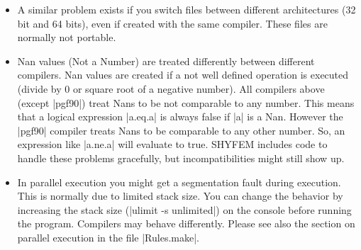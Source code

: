 \begin{itemize}
\item A similar problem exists if you switch files between different
architectures (32 bit and 64 bits), even if created with the same
compiler. These files are normally not portable.

\item Nan values (Not a Number) are treated differently between different
compilers. Nan values are created if a not well defined operation is
executed (divide by 0 or square root of a negative number). All compilers
above (except |pgf90|) treat Nans to be not comparable to any number.
This means that a logical expression |a.eq.a| is always false if |a|
is a Nan. However the |pgf90| compiler treats Nans to be comparable
to any other number. So, an expression like |a.ne.a| will evaluate to
true. SHYFEM includes code to handle these problems gracefully, but
incompatibilities might still show up.

\item In parallel execution you might get a segmentation fault during
execution. This is normally due to limited stack size. You can change
the behavior by increasing the stack size (|ulimit -s unlimited|)
on the console before running the program. Compilers may behave
differently. Please see also the section on parallel execution in the
file |Rules.make|.

\end{itemize}






